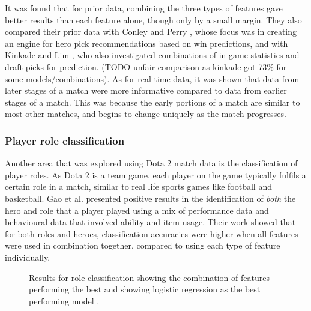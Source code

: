 \documentclass[Report.tex]{subfiles}
\begin{document}
It was found that for prior data, combining the three types of features gave better results than each feature alone, though only by a small margin. They also compared their prior data with Conley and Perry \cite{dota-conley}, whose focus was in creating an engine for hero pick recommendations based on win predictions, and with Kinkade and Lim \cite{dota-kinkade}, who also investigated combinations of in-game statistics and draft picks for prediction. (TODO unfair comparison as kinkade got 73\% for some models/combinations). As for real-time data, it was shown that data from later stages of a match were more informative compared to data from earlier stages of a match. This was because the early portions of a match are similar to most other matches, and begins to change uniquely as the match progresses.

\subsubsection{Player role classification}
Another area that was explored using Dota 2 match data is the classification of player roles. As Dota 2 is a team game, each player on the game typically fulfils a certain role in a match, similar to real life sports games like football and basketball. Gao et al. \cite{dota-gao} presented positive results in the identification of \textit{both} the hero and role that a player played using a mix of performance data and behavioural data that involved ability and item usage. Their work showed that for both roles and heroes, classification accuracies were higher when all features were used in combination together, compared to using each type of feature individually.

\begin{figure}[H]
\begin{subfigure}{0.45\textwidth}
\end{subfigure}
\hspace{\fill}
\begin{subfigure}{0.45\textwidth}
\end{subfigure}
\caption{Results for role classification showing the combination of features performing the best \cite{dota-gao} and showing logistic regression as the best performing model \cite{dota-eggert}.}
\end{figure}
\end{document}
